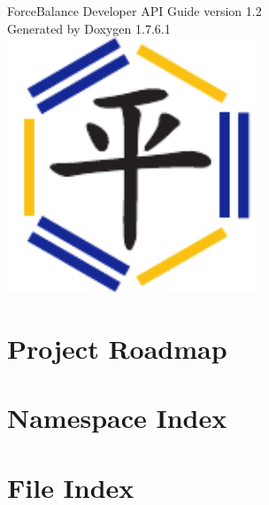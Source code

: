 \documentclass[letterpaper]{article}
\begin{document}
\hypersetup{pageanchor=false,citecolor=blue}
\begin{titlepage}
\vspace*{1cm}
\begin{center}

{\Large ForceBalance Developer API Guide version 1.2}\\
\vspace*{2cm}
{\large Generated by Doxygen 1.7.6.1}\\
\vspace*{2.5 cm}
\includegraphics[width=3in]{ForceBalance}
\end{center}
\end{titlepage}
\tableofcontents
{}
\hypersetup{pageanchor=true,citecolor=blue}
\section{Project Roadmap}
\label{roadmap}
\hypertarget{roadmap}{}

\section{Namespace Index}

\section{File Index}

\end{document}
